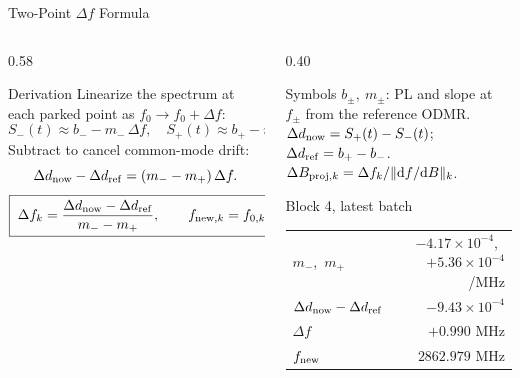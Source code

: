 \documentclass[aspectratio=169,10pt]{beamer}
\begin{document}
\begin{frame}{Two-Point $\Delta f$ Formula}
\vspace{-0.4em}
\begin{columns}[T,totalwidth=\textwidth]
\begin{column}{0.58\textwidth}
\begin{block}{Derivation}
\small
Linearize the spectrum at each parked point as $f_0 \!\to\! f_0+\Delta f$:
\[
S_-(t)\approx b_- - m_-\,\Delta f,\quad
S_+(t)\approx b_+ - m_+\,\Delta f .
\]
Subtract to cancel common-mode drift:
\[
\Delta d_{\rm now}-\Delta d_{\rm ref}=(m_- - m_+)\,\Delta f .
\]
\[
\boxed{\;\Delta f_k=\dfrac{\Delta d_{\rm now}-\Delta d_{\rm ref}}{m_- - m_+},
\qquad
f_{{\rm new},k}=f_{0,k}+\Delta f_k\;}
\]
\end{block}
\end{column}
\begin{column}{0.40\textwidth}
\begin{block}{Symbols}
\scriptsize
$b_\pm,\ m_\pm$: PL and slope at $f_\pm$ from the reference ODMR.\\[0.15em]
$\Delta d_{\rm now}=S_+(t)-S_-(t)$;\ \ $\Delta d_{\rm ref}=b_+-b_-$.\\[0.15em]
$\Delta B_{{\rm proj},k}=\Delta f_k/\|\mathrm{d}f/\mathrm{d}B\|_k$.
\end{block}
\begin{block}{Block 4, latest batch}
\centering\tiny
\begin{tabular}{@{}lr@{}}
\toprule
$m_-$,\ $m_+$ & $-4.17{\times}10^{-4}$,\ $+5.36{\times}10^{-4}$\,/MHz \\
$\Delta d_{\rm now}-\Delta d_{\rm ref}$ & $-9.43{\times}10^{-4}$ \\
$\Delta f$ & $+0.990$ MHz \\
$f_{\rm new}$ & $2862.979$ MHz \\
\bottomrule
\end{tabular}
\end{block}
\end{column}
\end{columns}
\end{frame}
\end{document}

